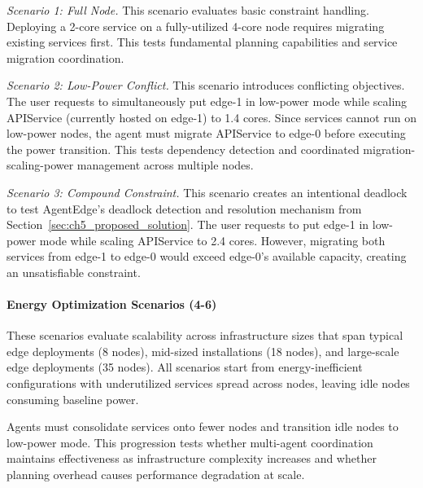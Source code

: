 \noindent\emph{Scenario 1: Full Node.} This scenario evaluates basic constraint handling. Deploying a 2-core service on a fully-utilized 4-core node requires migrating existing services first. This tests fundamental planning capabilities and service migration coordination.

\noindent\emph{Scenario 2: Low-Power Conflict.} This scenario introduces conflicting objectives. The user requests to simultaneously put edge-1 in low-power mode while scaling APIService (currently hosted on edge-1) to 1.4 cores. Since services cannot run on low-power nodes, the agent must migrate APIService to edge-0 before executing the power transition. This tests dependency detection and coordinated migration-scaling-power management across multiple nodes.

\noindent\emph{Scenario 3: Compound Constraint.} This scenario creates an intentional deadlock to test \ac{AgentEdge}'s deadlock detection and resolution mechanism from Section~\ref{sec:ch5_proposed_solution}. The user requests to put edge-1 in low-power mode while scaling APIService to 2.4 cores. However, migrating both services from edge-1 to edge-0 would exceed edge-0's available capacity, creating an unsatisfiable constraint.

\paragraph{Energy Optimization Scenarios (4-6)}
These scenarios evaluate scalability across infrastructure sizes that span typical edge deployments (8 nodes), mid-sized installations (18 nodes), and large-scale edge deployments (35 nodes). All scenarios start from energy-inefficient configurations with underutilized services spread across nodes, leaving idle nodes consuming baseline power. 

Agents must consolidate services onto fewer nodes and transition idle nodes to low-power mode. This progression tests whether multi-agent coordination maintains effectiveness as infrastructure complexity increases and whether planning overhead causes performance degradation at scale.


